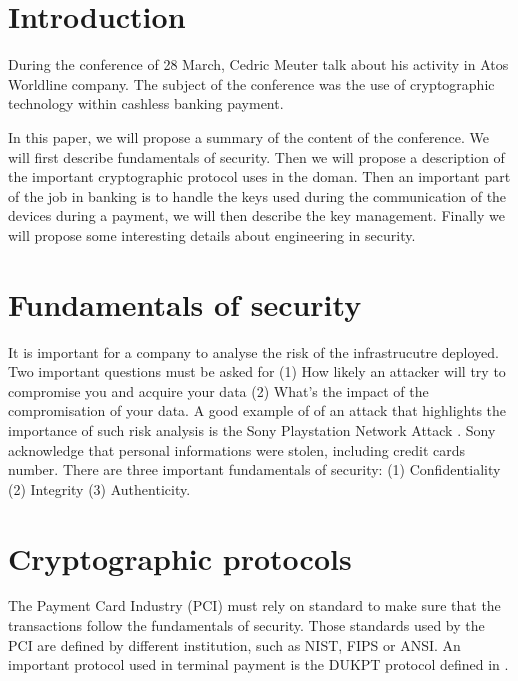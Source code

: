 \documentclass[10pt,a4paper]{article}
\title{INFO-F-??? - Conference Report #1 \\
Atos Wordline}
\author{Université Libre de Bruxelles \\
\\ Hakim Boulahya}
\begin{document}
\maketitle


\section{Introduction}

During the conference of 28 March, Cedric Meuter
talk about his activity in Atos Worldline company.
The subject of the conference was the use of
cryptographic technology within cashless banking payment.

In this paper, we will propose a summary of the content of the
conference. We will first describe fundamentals of security.
Then we will propose a description of the important
cryptographic protocol uses in the doman. Then an important
part of the job in banking is to handle the keys used
during the communication of the devices during a payment,
we will then describe the key management.
Finally we will propose some interesting details about
engineering in security.


\section{Fundamentals of security}

It is important for a company to analyse the risk
of the infrastrucutre deployed. Two important questions must
be asked for (1) How likely an attacker will try to compromise
you and acquire your data (2) What's the impact of the compromisation
of your data. A good example of of an attack that highlights
the importance of such risk analysis is the Sony Playstation Network
Attack \cite{raiu_cyber-threat_2012}. Sony acknowledge that
personal informations were stolen, including credit cards number.
There are three important fundamentals of security:
(1) Confidentiality (2) Integrity (3) Authenticity.

\section{Cryptographic protocols}

The Payment Card Industry (PCI) must rely on standard to make
sure that the transactions follow the fundamentals of security.
Those standards used by the PCI are defined by different institution, such
as NIST, FIPS or ANSI. An important protocol used in terminal payment
is the DUKPT protocol defined in \cite{dukpt_std}.
\end{document}

